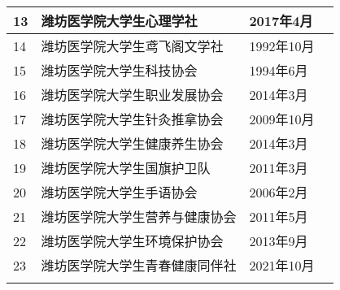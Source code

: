 \begin{center}
\begin{tabular}{|>{\centering\arraybackslash}p{2em}|>{\centering\arraybackslash}p{19.5em}|%
        >{\centering\arraybackslash}p{6em}|>{\centering\arraybackslash}p{5em}|}
        \cline{1-3}
        13 & 潍坊医学院大学生心理学社                  & 2017年4月  &                        \\
        \cline{1-3}
        14 & 潍坊医学院大学生鸢飞阁文学社                & 1992年10月 &                        \\
        \Xhline{1.2pt}
        15 & 潍坊医学院大学生科技协会                  & 1994年6月  & \multirow{2}{*}{创新创业类} \\
        \cline{1-3}
        16 & 潍坊医学院大学生职业发展协会                & 2014年3月  &                        \\
        \Xhline{1.2pt}
        17 & 潍坊医学院大学生针灸推拿协会                & 2009年10月 & \multirow{7}{*}{自律互助类} \\
        \cline{1-3}
        18 & 潍坊医学院大学生健康养生协会                & 2014年3月  &                        \\
        \cline{1-3}
        19 & 潍坊医学院大学生国旗护卫队                 & 2011年3月  &                        \\
        \cline{1-3}
        20 & 潍坊医学院大学生手语协会                  & 2006年2月  &                        \\
        \cline{1-3}
        21 & 潍坊医学院大学生营养与健康协会               & 2011年5月  &                        \\
        \cline{1-3}
        22 & 潍坊医学院大学生环境保护协会                & 2013年9月  &                        \\
        \cline{1-3}
        23 & 潍坊医学院大学生青春健康同伴社               & 2021年10月 &                        \\
        \Xhline{1.2pt}
    \end{tabular}
\end{center}


